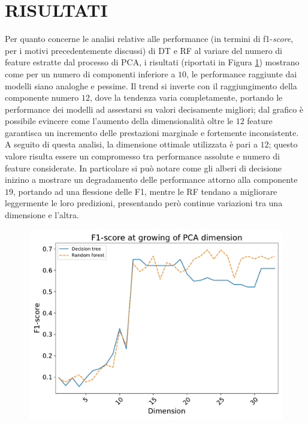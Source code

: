 \section{RISULTATI}
Per quanto concerne le analisi relative alle performance (in termini di f1-\textit{score}, per i motivi precedentemente discussi) di DT e RF al variare del numero di feature estratte dal processo di PCA, i risultati (riportati in Figura \ref{fig:pca-perf}) mostrano come per un numero di componenti inferiore a $10$, le performance raggiunte dai modelli siano analoghe e pessime. Il trend si inverte con il raggiungimento della componente numero $12$, dove la tendenza varia completamente, portando le performance dei modelli ad assestarsi su valori decisamente migliori; dal grafico è possibile evincere come l'aumento della dimensionalità oltre le $12$ feature garantisca un incremento delle prestazioni marginale e fortemente inconsistente.
A seguito di questa analisi, la dimensione ottimale utilizzata è pari a $12$; questo valore risulta essere un compromesso tra performance assolute e numero di feature considerate.
In particolare si può notare come gli alberi di decisione inizino a mostrare un degradamento delle performance attorno alla componente $19$, portando ad una flessione delle F1, mentre le RF tendano a migliorare leggermente le loro predizioni, presentando però continue variazioni tra una dimensione e l'altra.
\begin{figure}
	\centering
	\includegraphics[width=0.9\linewidth]{images/pca-perf}
	\caption{}
	\label{fig:pca-perf}
\end{figure}

